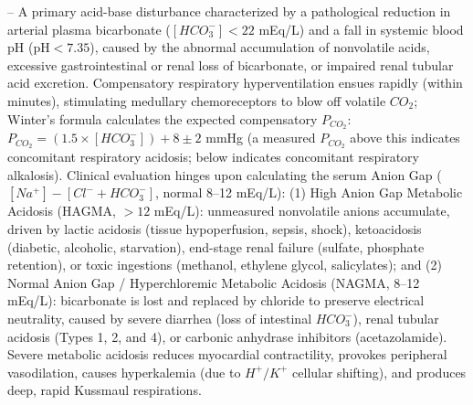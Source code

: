 -- A primary acid-base disturbance characterized by a pathological reduction in arterial plasma bicarbonate ($[HCO_3^-] < 22$ mEq/L) and a fall in systemic blood pH ($\text{pH} < 7.35$), caused by the abnormal accumulation of nonvolatile acids, excessive gastrointestinal or renal loss of bicarbonate, or impaired renal tubular acid excretion. Compensatory respiratory hyperventilation ensues rapidly (within minutes), stimulating medullary chemoreceptors to blow off volatile $CO_2$; Winter's formula calculates the expected compensatory $P_{CO_2}$: $P_{CO_2} = (1.5 \times [HCO_3^-]) + 8 \pm 2$ mmHg (a measured $P_{CO_2}$ above this indicates concomitant respiratory acidosis; below indicates concomitant respiratory alkalosis). Clinical evaluation hinges upon calculating the serum Anion Gap ($[Na^+] - [Cl^- + HCO_3^-]$, normal 8--12 mEq/L): (1) High Anion Gap Metabolic Acidosis (HAGMA, $>12$ mEq/L): unmeasured nonvolatile anions accumulate, driven by lactic acidosis (tissue hypoperfusion, sepsis, shock), ketoacidosis (diabetic, alcoholic, starvation), end-stage renal failure (sulfate, phosphate retention), or toxic ingestions (methanol, ethylene glycol, salicylates); and (2) Normal Anion Gap / Hyperchloremic Metabolic Acidosis (NAGMA, 8--12 mEq/L): bicarbonate is lost and replaced by chloride to preserve electrical neutrality, caused by severe diarrhea (loss of intestinal $HCO_3^-$), renal tubular acidosis (Types 1, 2, and 4), or carbonic anhydrase inhibitors (acetazolamide). Severe metabolic acidosis reduces myocardial contractility, provokes peripheral vasodilation, causes hyperkalemia (due to $H^+/K^+$ cellular shifting), and produces deep, rapid Kussmaul respirations.


